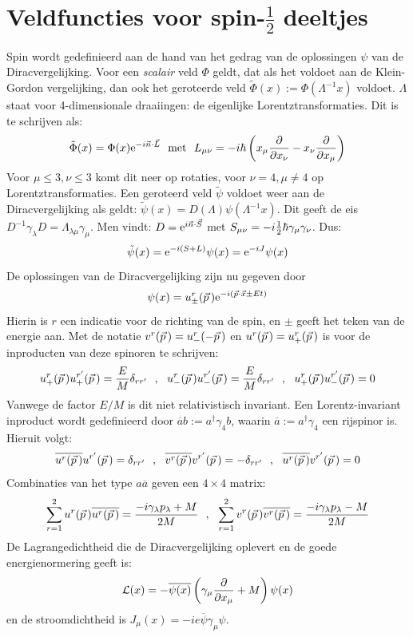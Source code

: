 \documentclass[twoside]{report}
\begin{document}
\section[~~Veldfuncties voor spin-$\frac{1}{2}$ deeltjes]{Veldfuncties voor spin-$\frac{1}{2}$ deeltjes}
Spin wordt gedefinieerd aan de hand van het gedrag van de oplossingen $\psi$
van de Diracvergelijking. Voor een {\it scalair} veld $\Phi$ geldt, dat als
het voldoet aan de Klein-Gordon vergelijking, dan ook het geroteerde veld
$\tilde{\Phi}(x):=\Phi(\Lambda^{-1}x)$ voldoet. $\Lambda$ staat voor
4-dimensionale draaiingen: de eigenlijke Lorentztransformaties. Dit is te
schrijven als:
\[
\tilde{\Phi}(x)=\Phi(x){\rm e}^{-i\vec{n}\cdot\vec{L}}~~\mbox{met}~~
L_{\mu\nu}=-i\hbar\left(x_\mu\frac{\partial }{\partial x_\nu}-x_\nu\frac{\partial }{\partial x_\mu}\right)
\]
Voor $\mu\leq3,\nu\leq3$ komt dit neer op rotaties, voor $\nu=4,\mu\neq4$
op Lorentztransformaties.
\npar
Een geroteerd veld $\tilde{\psi}$ voldoet weer aan de Diracvergelijking
als geldt: $\tilde{\psi}(x)=D(\Lambda)\psi(\Lambda^{-1}x)$. Dit geeft de eis
$D^{-1}\gamma_\lambda D=\Lambda_{\lambda\mu}\gamma_\mu$. Men vindt:
$D={\rm e}^{i\vec{n}\cdot\vec{S}}$ met $S_{\mu\nu}=-i\mbox{$\frac{1}{2}$}\hbar\gamma_\mu\gamma_\nu$.
Dus:
\[
\tilde{\psi}(x)={\rm e}^{-i(S+L)}\psi(x)={\rm e}^{-iJ}\psi(x)
\]
De oplossingen van de Diracvergelijking zijn nu gegeven door
\[
\psi(x)=u_\pm^r(\vec{p}\,){\rm e}^{-i(\vec{p}\cdot\vec{x}\pm Et)}
\]
Hierin is $r$ een indicatie voor de richting van de spin, en $\pm$ geeft het
teken van de energie aan. Met de notatie $v^r(\vec{p}\,)=u^r_-(-\vec{p}\,)$ en
$u^r(\vec{p}\,)=u^r_+(\vec{p}\,)$ is voor de inproducten van deze spinoren te
schrijven:
\[
u_+^r(\vec{p}\,)u_+^{r'}(\vec{p}\,)=\frac{E}{M}\delta_{rr'}~~,~~
u_-^r(\vec{p}\,)u_-^{r'}(\vec{p}\,)=\frac{E}{M}\delta_{rr'}~~,~~
u_+^r(\vec{p}\,)u_-^{r'}(\vec{p}\,)=0
\]
Vanwege de factor $E/M$ is dit niet relativistisch invariant. Een
Lorentz-invariant inproduct wordt gedefinieerd door
$\overline{a}b:=a^\dagger\gamma_4b$, waarin $\overline{a}:=a^\dagger\gamma_4$
een rijspinor is. Hieruit volgt:
\[
\overline{u^r(\vec{p}\,)}u^{r'}(\vec{p}\,)=\delta_{rr'}~~,~~
\overline{v^r(\vec{p}\,)}v^{r'}(\vec{p}\,)=-\delta_{rr'}~~,~~
\overline{u^r(\vec{p}\,)}v^{r'}(\vec{p}\,)=0
\]
Combinaties van het type $a\overline{a}$ geven een $4\times4$ matrix:
\[
\sum_{r=1}^2 u^r(\vec{p}\,)\overline{u^r(\vec{p}\,)}=\frac{-i\gamma_\lambda p_\lambda+M}{2M}~~,~~
\sum_{r=1}^2 v^r(\vec{p}\,)\overline{v^r(\vec{p}\,)}=\frac{-i\gamma_\lambda p_\lambda-M}{2M}
\]
De Lagrangedichtheid die de Diracvergelijking oplevert en de goede
energienormering geeft is:
\[
{\cal L}(x)=-\overline{\psi(x)}\left(\gamma_\mu\frac{\partial }{\partial x_\mu}+M\right)\psi(x)
\]
en de stroomdichtheid is $J_\mu(x)=-ie\overline{\psi}\gamma_\mu\psi$.
\end{document}
